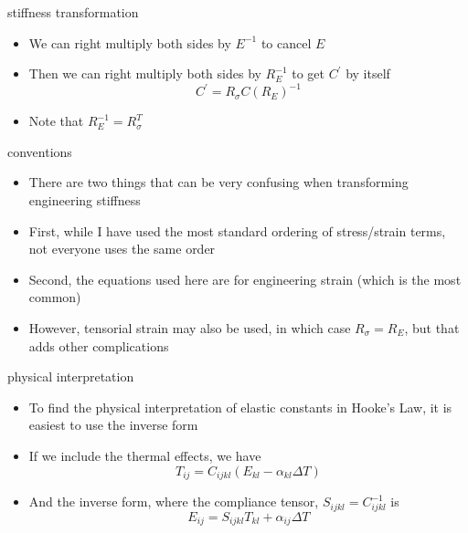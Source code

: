 \documentclass[
  letterpaper,
  ignorenonframetext,
  aspectratio=43,
  handout,
  12pt]{beamer}
\providecommand{\tightlist}{%
  \setlength{\itemsep}{0pt}\setlength{\parskip}{0pt}}
\providecommand{\tightlist}{%
\setlength{\itemsep}{0pt}\setlength{\parskip}{0pt}}
\begin{document}
\begin{frame}{stiffness transformation}
\protect\hypertarget{stiffness-transformation-1}{}
\begin{itemize}
\item
  We can right multiply both sides by \(E^{-1}\) to cancel \(E\)
\item
  Then we can right multiply both sides by \(R_E^{-1}\) to get
  \(C^\prime\) by itself \[C^\prime = R_\sigma C (R_E)^{-1}\]
\item
  Note that \(R_E^{-1} = R_\sigma^T\)
\end{itemize}
\end{frame}

\begin{frame}{conventions}
\protect\hypertarget{conventions}{}
\begin{itemize}
\tightlist
\item
  There are two things that can be very confusing when transforming
  engineering stiffness
\item
  First, while I have used the most standard ordering of stress/strain
  terms, not everyone uses the same order
\item
  Second, the equations used here are for engineering strain (which is
  the most common)
\item
  However, tensorial strain may also be used, in which case
  \(R_\sigma = R_E\), but that adds other complications
\end{itemize}
\end{frame}

\begin{frame}{physical interpretation}
\protect\hypertarget{physical-interpretation}{}
\begin{itemize}
\item
  To find the physical interpretation of elastic constants in Hooke's
  Law, it is easiest to use the inverse form
\item
  If we include the thermal effects, we have
  \[T_{ij} = C_{ijkl}(E_{kl}-\alpha_{kl}\Delta T)\]
\item
  And the inverse form, where the compliance tensor,
  \(S_{ijkl} = C_{ijkl}^{-1}\) is
  \[E_{ij} = S_{ijkl} T_{kl} + \alpha_{ij}\Delta T\]
\end{itemize}
\end{frame}
\end{document}
